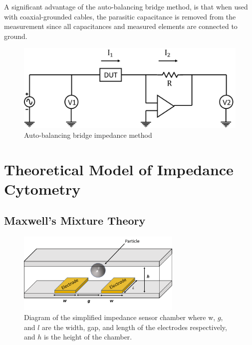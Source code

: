 A significant advantage of the auto-balancing bridge method, is that when used with coaxial-grounded cables, the parasitic capacitance is removed from the measurement since all capacitances and measured elements are connected to ground. 
\clearpage

 \begin{figure}[ht]
    \centering
    \includegraphics[width=\textwidth]{images/autoBalancingBridge.png}
    \caption[Auto-balancing bridge impedance method]{Auto-balancing bridge impedance method}
    \label{fig:auto-balancing_bridge}
\end{figure}
 
 
 \section[Model of Cell Suspension Impedance]{Theoretical Model of Impedance Cytometry}
 \label{sec:theory_impedance_cytometry}

\subsection{Maxwell's Mixture Theory}
\label{sec:maxwell_mixture_theory}
 \begin{figure}[ht]
 \centering
 \includegraphics[width=0.7\textwidth]{images/cellAndElectrodes.png}
 \caption[Schematic diagram of simplified impedance sensor chamber.]{Diagram of the simplified impedance sensor chamber where w, $g$, and $l$ are the width, gap, and length of the electrodes respectively, and $h$ is the height of the chamber.}
 \label{fig:simplified_IS}
 \end{figure}
 
